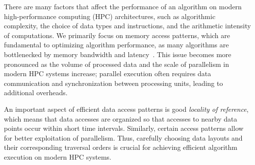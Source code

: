 \label{chap:introduction}



There are many factors that affect the performance of an algorithm on modern high-performance computing (HPC) architectures, such as algorithmic complexity, the choice of data types and instructions, and the arithmetic intensity of computations. We primarily focus on memory access patterns, which are fundamental to optimizing algorithm performance, as many algorithms are bottlenecked by memory bandwidth and latency~\cite{hennessy2019computer,drepper2007every}. This issue becomes more pronounced as the volume of processed data and the scale of parallelism in modern HPC systems increase; parallel execution often requires data communication and synchronization between processing units, leading to additional overheads.


An important aspect of efficient data access patterns is good \emph{locality of reference}, which means that data accesses are organized so that accesses to nearby data points occur within short time intervals. Similarly, certain access patterns allow for better exploitation of parallelism. Thus, carefully choosing data layouts and their corresponding traversal orders is crucial for achieving efficient algorithm execution on modern HPC systems.

